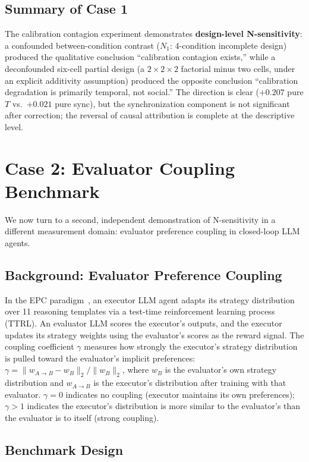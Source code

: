\documentclass[11pt]{article}
\begin{document}
\subsection{Summary of Case 1}

The calibration contagion experiment demonstrates \textbf{design-level N-sensitivity}: a confounded between-condition contrast ($N_1$: 4-condition incomplete design) produced the qualitative conclusion ``calibration contagion exists,'' while a deconfounded six-cell partial design (a $2 \times 2 \times 2$ factorial minus two cells, under an explicit additivity assumption) produced the opposite conclusion ``calibration degradation is primarily temporal, not social.'' The direction is clear ($+0.207$ pure $T$ vs.\ $+0.021$ pure sync), but the synchronization component is not significant after correction; the reversal of causal attribution is complete at the descriptive level.

\section{Case 2: Evaluator Coupling Benchmark}
\label{sec:case2}

We now turn to a second, independent demonstration of N-sensitivity in a different measurement domain: evaluator preference coupling in closed-loop LLM agents.

\subsection{Background: Evaluator Preference Coupling}

In the EPC paradigm~\cite{liu2026mmepc}, an executor LLM agent adapts its strategy distribution over 11 reasoning templates via a test-time reinforcement learning process (TTRL). An evaluator LLM scores the executor's outputs, and the executor updates its strategy weights using the evaluator's scores as the reward signal. The coupling coefficient $\gamma$ measures how strongly the executor's strategy distribution is pulled toward the evaluator's implicit preferences: $\gamma = \|w_{A\to B} - w_B\|_2 / \|w_B\|_2$, where $w_B$ is the evaluator's own strategy distribution and $w_{A\to B}$ is the executor's distribution after training with that evaluator. $\gamma = 0$ indicates no coupling (executor maintains its own preferences); $\gamma > 1$ indicates the executor's distribution is more similar to the evaluator's than the evaluator is to itself (strong coupling).

\subsection{Benchmark Design}
\end{document}

